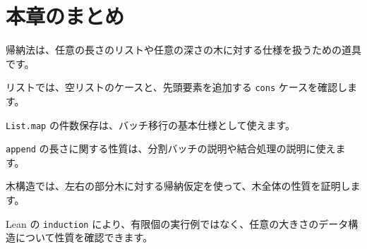 \section{本章のまとめ}

帰納法は、任意の長さのリストや任意の深さの木に対する仕様を扱うための道具です。

リストでは、空リストのケースと、先頭要素を追加する \texttt{cons} ケースを確認します。

\texttt{List.map} の件数保存は、バッチ移行の基本仕様として使えます。

\texttt{append} の長さに関する性質は、分割バッチの説明や結合処理の説明に使えます。

木構造では、左右の部分木に対する帰納仮定を使って、木全体の性質を証明します。

Lean の \texttt{induction} により、有限個の実行例ではなく、任意の大きさのデータ構造について性質を確認できます。

